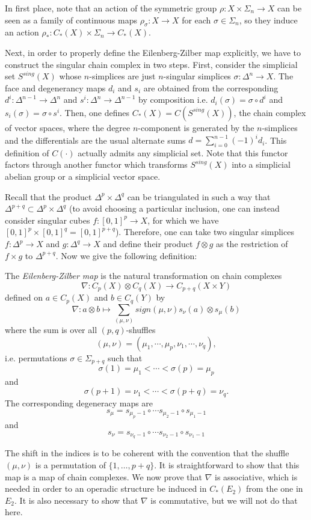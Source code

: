 \documentclass[TFM.tex]{subfiles}
\begin{document}
In first place, note that an action of the symmetric group $\rho:X\times\Sigma_n\to X$ can be seen as a family of continuous maps $\rho_\sigma:X\to X$ for each $\sigma\in\Sigma_n$, so they induce an action $\rho_*: C_*(X)\times\Sigma_n\to C_*(X)$. %

Next, in order to properly define the Eilenberg-Zilber map explicitly, we have to construct the singular chain complex in two steps. First, consider the simplicial set $S^{sing}(X)$ whose $n$-simplices are just $n$-singular simplices $\sigma:\Delta^n\to X$. The face and degenerancy maps $d_i$ and $s_i$ are obtained from the corresponding $d^i:\Delta^{n-1}\to \Delta^{n}$ and $s^i:\Delta^n\to\Delta^{n-1}$ by composition i.e. $d_i(\sigma)=\sigma\circ d^i$ and $s_i(\sigma)=\sigma\circ s^i$. Then, one defines $C_*(X)=C(S^{sing}(X))$, the chain complex of vector spaces, where the degree $n$-component is generated by the $n$-simplices and the differentials are the usual alternate sums $d=\sum_{i=0}^{n-1}(-1)^id_i$. This definition of $C(\cdot)$ actually admits any simplicial set. Note that this functor factors through another functor which transforms $S^{sing}(X)$ into a simplicial abelian group or a simplicial vector space.

Recall that the product $\Delta^p\times\Delta^q$ can be triangulated in such a way that $\Delta^{p+q}\subset \Delta^p\times\Delta^q$ \cite[Proof of Theorem 2.10]{Hatcher} (to avoid choosing a particular inclusion, one can instead consider singular cubes $f:[0,1]^p\to X$, for which we have $[0,1]^p\times [0,1]^q=[0,1]^{p+q}$). Therefore, one can take two singular simplices $f:\Delta^p\to X$ and $g:\Delta^q\to X$ and define their product $f\otimes g$ as the restriction of $f\times g$ to $\Delta^{p+q}$. Now we give the following definition:

\begin{defi}
The \emph{Eilenberg-Zilber map} is the natural transformation on chain complexes
\[
\nabla :  C_p(X) \otimes C_q(X) \to C_{p+q}(X \times Y)
\]
defined on $a\in C_p(X)$ and $b\in C_q(Y)$ by 
\[
\nabla : a \otimes b \mapsto 
   \sum_{(\mu,\nu)} sign(\mu,\nu) s_\nu(a) \otimes s_\mu(b)
\]
where the sum is over all $(p,q)$-shuffles
\[
(\mu,\nu) = (\mu_1, \cdots, \mu_p, \nu_1, \cdots, \nu_q),
\]
i.e. permutations $\sigma\in\Sigma_{p+q}$ such that $$\sigma(1)=\mu_1<\cdots<\sigma(p)=\mu_p$$ and $$\sigma(p+1)=\nu_1<\cdots<\sigma(p+q)=\nu_q.$$ The corresponding degeneracy maps are
\[
s_{\mu} = s_{\mu_p - 1} \circ \cdots s_{\mu_2 - 1} \circ s_{\mu_1 - 1}
\]
and
\[
s_{\nu} = s_{\nu_q - 1} \circ \cdots s_{\nu_2 - 1} \circ s_{\nu_1 - 1}
\]
\end{defi}
The shift in the indices is to be coherent with the convention that the shuffle $(μ,ν)$ is a permutation of $\{1,\dots,p+q\}$. It is straightforward to show that this map is a map of chain complexes. We now prove that $\nabla$ is associative, which is needed in order to an operadic structure be induced in $C_*(E_2)$ from the one in $E_2$. It is also necessary to show that $\nabla$ is commutative, but we will not do that here.
\end{document}
